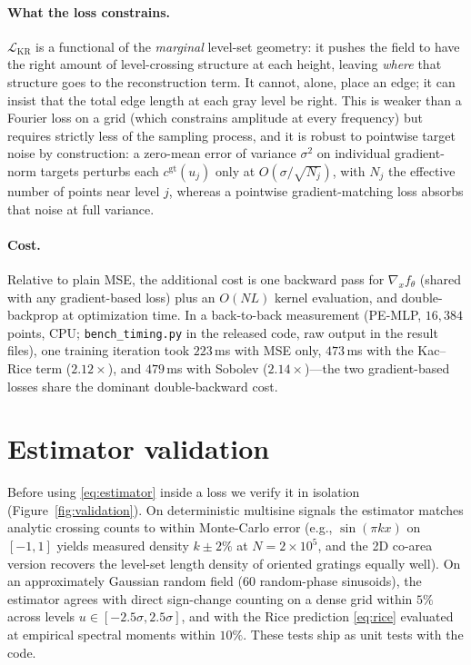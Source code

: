 \documentclass[10pt]{article}
\newcommand{\loss}{\mathcal{L}}
\begin{document}
\paragraph{What the loss constrains.} $\loss_{\mathrm{KR}}$ is a functional of the
\emph{marginal} level-set geometry: it pushes the field to have the right amount of
level-crossing structure at each height, leaving \emph{where} that structure goes to the
reconstruction term. It cannot, alone, place an edge; it can insist that the total edge
length at each gray level be right. This is weaker than a Fourier loss on a grid (which
constrains amplitude at every frequency) but requires strictly less of the sampling
process, and it is robust to pointwise target noise by construction: a zero-mean error
of variance $\sigma^2$ on individual gradient-norm targets perturbs each
$c^{\mathrm{gt}}(u_j)$ only at $O(\sigma/\sqrt{N_j})$, with $N_j$ the effective number of
points near level $j$, whereas a pointwise gradient-matching loss absorbs that noise at
full variance.

\paragraph{Cost.} Relative to plain MSE, the additional cost is one backward pass for
$\nabla_x f_\theta$ (shared with any gradient-based loss) plus an $O(NL)$ kernel
evaluation, and double-backprop at optimization time. In a back-to-back measurement
(PE-MLP, $16{,}384$ points, CPU; \texttt{bench\_timing.py} in the released code, raw
output in the result files), one training iteration took $223$\,ms with MSE only,
$473$\,ms with the Kac--Rice term ($2.12\times$), and $479$\,ms with Sobolev
($2.14\times$)---the two gradient-based losses share the dominant double-backward
cost.

\section{Estimator validation}
\label{sec:validation}

Before using \eqref{eq:estimator} inside a loss we verify it in isolation
(Figure~\ref{fig:validation}). On deterministic multisine signals the estimator matches
analytic crossing counts to within Monte-Carlo error (e.g., $\sin(\pi k x)$ on $[-1,1]$
yields measured density $k\pm2\%$ at $N=2\times10^5$, and the 2D co-area version
recovers the level-set length density of oriented gratings equally well). On an
approximately Gaussian random field (60 random-phase sinusoids), the estimator agrees
with direct sign-change counting on a dense grid within $5\%$ across levels
$u\in[-2.5\sigma, 2.5\sigma]$, and with the Rice prediction \eqref{eq:rice} evaluated at
empirical spectral moments within $10\%$. These tests ship as unit tests with the code.
\end{document}
